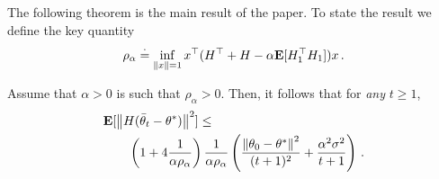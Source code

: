 The following theorem is the main result of the paper.
To state the result we define the key quantity
\begin{align}
\label{eq:rhodef}
\rho_\alpha\stackrel{\cdot}{=} \inf_{\left\| x\right\|=1} x^\top (H^\top+H-\alpha\mathbf{E}[ H_1^\top H_1] )x\,.
\end{align}
\begin{theorem}\label{maintheorem}
Assume that $\alpha>0$ is such that $\rho_\alpha>0$. Then, it follows that for \emph{any} $t\ge 1$,
\begin{align}
\begin{split}
\MoveEqLeft\E[\norm{H(\tb_t-\ts)}^2]\leq \\
&\left(1+4\frac1{\alpha\rho_{\alpha}}\right) \frac{1}{\alpha\rho_{\alpha}}
 \left(\frac{\norm{\theta_0-\ts}^2}{(t+1)^2}+\frac{\alpha^2\sigma^2}{t+1} \right)\,.
\end{split}
\end{align}
\end{theorem}
